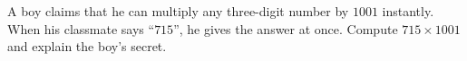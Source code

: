 A boy claims that he can multiply any three-digit number by $1001$ instantly. When his classmate says ``$715$'', he gives the answer at once. Compute $715\times1001$ and explain the boy's secret.
